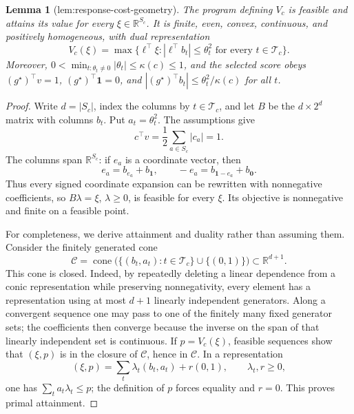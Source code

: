 \documentclass{article}
\newtheorem{lemma}{Lemma}
\begin{document}
\begin{lemma}[lem:response-cost-geometry]\label{lem:response-cost-geometry}
The program defining \(V_c\) is feasible and attains its value for every \(\xi\in\mathbb R^{S_c}\). It is finite, even, convex, continuous, and positively homogeneous, with dual representation \[V_c(\xi)=\max\{\ell^\top \xi:|\ell^\top b_t|\le\theta_t^2\text{ for every }t\in\mathcal T_c\}.\] Moreover, \(0<\min_{t:\theta_t\ne0}|\theta_t|\le\kappa(c)\le1\), and the selected score obeys \((g^\star)^\top v=1\), \((g^\star)^\top\mathbf1=0\), and \(|(g^\star)^\top b_t|\le\theta_t^2/\kappa(c)\) for all \(t\).
\end{lemma}
\begin{proof}
Write \(d=|S_c|\), index the columns by \(t\in\mathcal T_c\), and let \(B\) be the \(d\times2^d\) matrix with columns \(b_t\).  Put \(a_t=\theta_t^2\).  The assumptions give
\[
c^\top v=\frac12\sum_{a\in S_c}|c_a|=1.
\]
The columns span \(\mathbb R^{S_c}\): if \(e_a\) is a coordinate vector, then
\[
e_a=b_{e_a}+b_{\mathbf1},\qquad -e_a=b_{\mathbf1-e_a}+b_{\mathbf0}.
\]
Thus every signed coordinate expansion can be rewritten with nonnegative coefficients, so \(B\lambda=\xi\), \(\lambda\ge0\), is feasible for every \(\xi\).  Its objective is nonnegative and finite on a feasible point.

For completeness, we derive attainment and duality rather than assuming them.  Consider the finitely generated cone
\[
\mathcal C=\operatorname{cone}\bigl(\{(b_t,a_t):t\in\mathcal T_c\}\cup\{(0,1)\}\bigr)
 \subset\mathbb R^{d+1}.
\]
This cone is closed.  Indeed, by repeatedly deleting a linear dependence from a conic representation while preserving nonnegativity, every element has a representation using at most \(d+1\) linearly independent generators.  Along a convergent sequence one may pass to one of the finitely many fixed generator sets; the coefficients then converge because the inverse on the span of that linearly independent set is continuous.  If \(p=V_c(\xi)\), feasible sequences show that \((\xi,p)\) is in the closure of \(\mathcal C\), hence in \(\mathcal C\).  In a representation
\[
(\xi,p)=\sum_t\lambda_t(b_t,a_t)+r(0,1),\qquad \lambda_t,r\ge0,
\]
one has \(\sum_ta_t\lambda_t\le p\); the definition of \(p\) forces equality and \(r=0\).  This proves primal attainment.


\end{proof}
\end{document}
